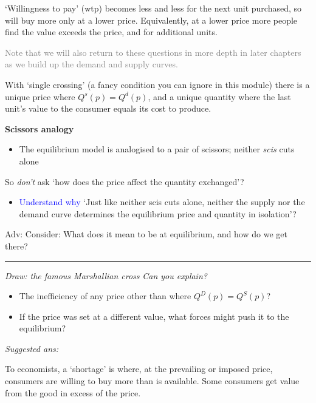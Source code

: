 \documentclass[]{article}
\providecommand{\tightlist}{%
  \setlength{\itemsep}{0pt}\setlength{\parskip}{0pt}}
\begin{document}
`Willingness to pay' (wtp) becomes less and less for the next unit purchased, so will buy more only at a lower price. Equivalently, at a lower price more people find the value exceeds the price, and for additional units.

\textcolor{gray}{Note that we will also return to these questions in more depth in later chapters as we build up the demand and supply curves.}

\bigskip

With `single crossing' (a fancy condition you can ignore in this module) there is a unique price where \(Q^s(p)=Q^d(p)\),
and a unique quantity where the last unit's value to the consumer equals its cost to produce.

\textbf{Scissors analogy}

\begin{itemize}
\tightlist
\item
  The equilibrium model is analogised to a pair of scissors; neither \emph{scis} cuts alone
\end{itemize}

So \emph{don't} ask `how does the price affect the quantity exchanged'?

\begin{itemize}
\tightlist
\item
  \textcolor{blue}{Understand why} `Just like neither scis cuts alone, neither the supply nor the demand curve determines the equilibrium price and quantity in isolation'?
\end{itemize}

\textcolor{RawSienna}{Adv: Consider: What does it mean to be at equilibrium, and how do we get there?}

\begin{center}\rule{0.5\linewidth}{\linethickness}\end{center}

\emph{Draw: the famous Marshallian cross} \emph{Can you explain?}

\begin{itemize}
\item
  The inefficiency of any price other than where \(Q^D(p)=Q^S(p)\)?
\item
  If the price was set at a different value, what forces might push it to the equilibrium?
\end{itemize}

\bigskip

\emph{Suggested ans:}

To economists, a `shortage' is where, at the prevailing or imposed price, consumers are willing to buy more than is available. Some consumers get value from the good in excess of the price.\\
\end{document}
